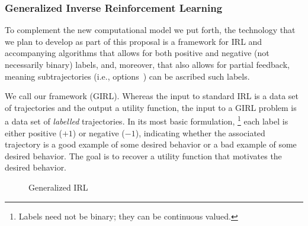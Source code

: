 
\subsubsection*{\large Generalized Inverse Reinforcement Learning}
\label{sec:girl}

To complement the new computational model we put forth, the
technology that we plan to develop as part of this proposal is a
framework for IRL and accompanying algorithms that allows for both
positive and negative (not necessarily binary) labels, and, moreover,
that also allows for partial feedback, meaning subtrajectories (i.e.,
options~\cite{sutton99}) can be ascribed such labels.

We call our framework
 (GIRL).  Whereas the input to standard IRL is
a data set of trajectories
and the output a utility function, the input to a GIRL problem is a
data set of \emph{labelled\/} trajectories. 
In its most basic formulation,%
\footnote{Labels need not be binary; they can be continuous valued.}
each label is either positive ($+1$) or negative ($-1$), indicating
whether the associated trajectory is a good example of some desired
behavior or a bad example of some desired behavior.  The goal is to
recover a utility function that motivates the desired behavior.

\begin{wrapfigure}{l}{0.366\textwidth}
\caption{Generalized IRL}
\label{fig:girl}
\end{wrapfigure}

